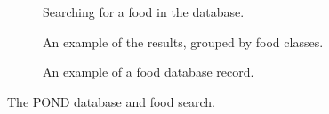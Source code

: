 \begin{figure}	
\centering
	\begin{subfigure}[t]{1.25in}
		\centering
		\setlength\fboxsep{0pt}
\setlength\fboxrule{0.5pt}
		\caption{Searching for a food in the database. }\label{fig:pond_search}
	\end{subfigure}
\quad
\begin{subfigure}[t]{1.25in}
		\centering
		\setlength\fboxsep{0pt}
\setlength\fboxrule{0.5pt}
		\caption{An example of the results, grouped by food classes.}\label{fig:pond_db_results}
	\end{subfigure}
\quad
\begin{subfigure}[t]{1.25in}
		\centering
		\setlength\fboxsep{0pt}
\setlength\fboxrule{0.5pt}
		\caption{An example of a food database record. }\label{fig:pond_db_record}
	\end{subfigure}
	\caption{The POND database and food search. }\label{fig:pond_database}
\end{figure}



